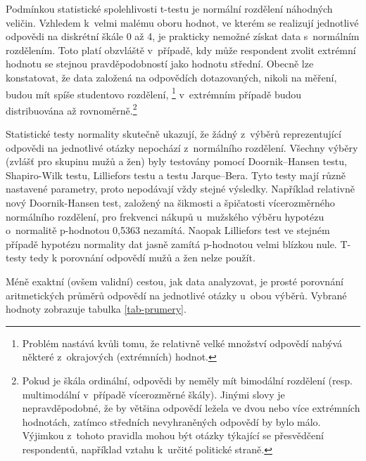 \documentclass[12pt,oneside,openany]{fithesis}
\begin{document}
                Podmínkou statistické spolehlivosti t-testu je normální 
rozdělení náhodných veličin. Vzhledem k~velmi malému oboru hodnot, ve 
kterém se realizují jednotlivé odpovědi na diskrétní škále 0 až 4, je 
prakticky nemožné získat data s~normálním rozdělením. Toto platí 
obzvláště v~případě, kdy může respondent zvolit extrémní hodnotu 
se stejnou pravděpodobností jako hodnotu střední. Obecně lze konstatovat, 
že data založená na odpovědích dotazovaných, nikoli na měření, budou 
mít spíše studentovo rozdělení, 
\footnote{
                    Problém nastává kvůli tomu, že relativně velké 
množství odpovědí nabývá některé z~okrajových (extrémních) hodnot.
                }
v~extrémním případě budou distribuována až 
rovnoměrně.\footnote{
                    Pokud je škála ordinální, odpovědi by neměly mít 
bimodální rozdělení (resp. multimodální v~případě vícerozměrné 
škály). Jinými slovy je nepravděpodobné, že by většina odpovědí 
ležela ve dvou nebo více extrémních hodnotách, zatímco středních 
nevyhraněných odpovědí by bylo málo. Výjimkou z~tohoto pravidla mohou 
být otázky týkající se přesvědčení respondentů, například vztahu 
k~určité politické straně.
                }

                Statistické testy normality skutečně ukazují, že žádný 
z~výběrů reprezentující odpovědi na jednotlivé otázky nepochází 
z~normálního rozdělení. Všechny výběry (zvlášť pro skupinu mužů a 
žen) byly testovány pomocí Doornik--Hansen testu, Shapiro-Wilk testu, 
Lilliefors testu a testu Jarque--Bera. Tyto testy mají různě nastavené 
parametry, proto nepodávají vždy stejné výsledky. Například relativně 
nový Doornik-Hansen test, založený na šikmosti a špičatosti vícerozměrného 
normálního rozdělení, pro frekvenci nákupů u~mužského výběru 
hypotézu o~normalitě p-hodnotou 0,5363 
nezamítá. \cite{dh-test}{} Naopak Lilliefors test ve stejném případě 
hypotézu normality dat jasně zamítá p-hodnotou velmi blízkou nule.
T-testy tedy k porovnání odpovědí mužů a žen nelze použít.

Méně exaktní (ovšem validní) cestou, jak data analyzovat, je prosté porovnání 
aritmetických průměrů odpovědí na jednotlivé otázky u~obou výběrů. 
Vybrané hodnoty zobrazuje tabulka \hyperlink{tab-prumery}{\ref{tab-prumery}}.
\end{document}
